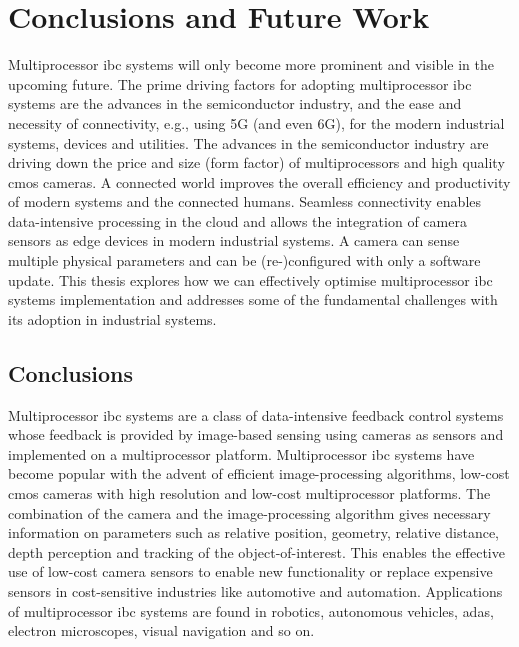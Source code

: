 \chapter{Conclusions and Future Work}
\label{chap:concl}

\glsresetall

Multiprocessor \gls{ibc} systems will only become more prominent and visible in the upcoming future.
The prime driving factors for adopting multiprocessor \gls{ibc} systems are the advances in the semiconductor industry, and the ease and necessity of connectivity, e.g., using 5G (and even 6G), for the modern industrial systems, devices and utilities.
The advances in the semiconductor industry are driving down the price and size (form factor) of multiprocessors and high quality \gls{cmos} cameras. 
A connected world improves the overall efficiency and productivity of modern systems and the connected humans.
Seamless connectivity enables data-intensive processing in the cloud and allows the integration of camera sensors as edge devices in modern industrial systems.
A camera can sense multiple physical parameters and can be (re-)configured with only a software update.
This thesis explores how we can effectively optimise  multiprocessor \gls{ibc} systems implementation and addresses some of the fundamental challenges with its adoption in industrial systems.

\section{Conclusions}
Multiprocessor \gls{ibc} systems are a class of data-intensive feedback control systems whose feedback is provided by image-based sensing using cameras as sensors and implemented on a multiprocessor platform. 
Multiprocessor \gls{ibc} systems have become popular with the advent of efficient image-processing algorithms, low-cost \gls{cmos} cameras with high resolution and low-cost multiprocessor platforms. 
The combination of the camera and the image-processing algorithm gives necessary information on parameters such as relative position, geometry, relative distance, depth perception and tracking of the object-of-interest. 
This enables the effective use of low-cost camera sensors to enable new functionality or replace expensive sensors in cost-sensitive industries like automotive and automation. 
Applications of multiprocessor \gls{ibc} systems are found in robotics, autonomous vehicles, \gls{adas}, electron microscopes, visual navigation and so on.

